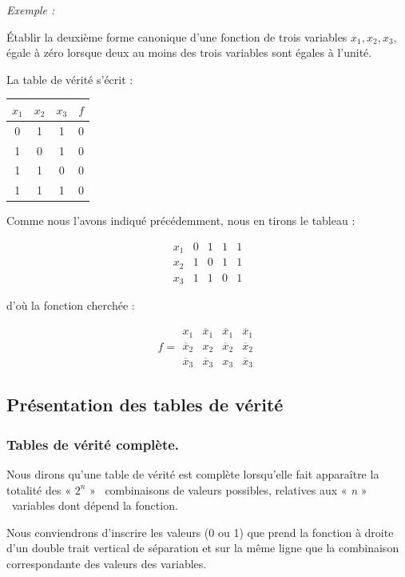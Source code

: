 \textit{Exemple :}

Établir la deuxième forme canonique d'une fonction de trois variables
$x_{1},x_{2},x_{3}$, égale à zéro lorsque deux au moins des trois
variables sont égales à l'unité.

La table de vérité s'écrit :

\begin{center}
\begin{tabular}{|c|c|c||c|}
\hline 
$x_{1}$  & $x_{2}$  & $x_{3}$  & $f$ \tabularnewline
\hline 
0  & 1  & 1  & 0 \tabularnewline
1  & 0  & 1  & 0 \tabularnewline
1  & 1  & 0  & 0 \tabularnewline
1  & 1  & 1  & 0 \tabularnewline
\hline 
\end{tabular}
\end{center}

Comme nous l'avons indiqué précédemment, nous en tirons le tableau
:

\[
\begin{array}{c|c|c|c|c|}
x_{1} & 0 & 1 & 1 & 1\\
x_{2} & 1 & 0 & 1 & 1\\
x_{3} & 1 & 1 & 0 & 1
\end{array}
\]

d'où la fonction cherchée :

\[
f=\begin{array}{|c|c|c|c|}
{x}_{1} & \overline{x}_{1} & \overline{x}_{1} & \overline{x}_{1}\\
\overline{x}_{2} & {x}_{2} & \overline{x}_{2} & \overline{x}_{2}\\
\overline{x}_{3} & \overline{x}_{3} & {x}_{3} & \overline{x}_{3}
\end{array}
\]


\subsection{Présentation des tables de vérité}

\subsubsection{Tables de vérité complète.}

\textendash{} Nous dirons qu'une table de vérité est complète lorsqu'elle
fait apparaître la totalité des « $2^{n}$ » \-~combinaisons de
valeurs possibles, relatives aux « \textit{n} » \-~variables dont
dépend la fonction.

Nous conviendrons d'inscrire les valeurs (0 ou 1) que prend la fonction
à droite d'un double trait vertical de séparation et sur la même ligne
que la combinaison correspondante des valeurs des variables.

